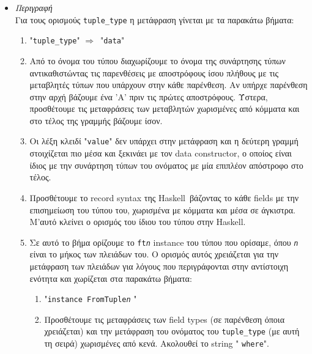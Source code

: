 \documentclass[diploma]{softlab-thesis}
\def\H{Haskell}
\def\lra{$\Longrightarrow$\ }
\begin{document}
\begin{itemize}
\begin{verbatim}
c0root :: a1 -> A'Tree a1 -> A'Tree a1
c0subtrees :: A'Trees a1 -> A'Tree a1 -> A'Tree a1
c0root = \new x -> x { root = new }
c0subtrees = \new x -> x { subtrees = new }
\end{verbatim}
\item
\textit{Περιγραφή}\\

Για τους ορισμούς \verb|tuple_type| η μετάφραση γίνεται με τα παρακάτω βήματα:

\begin{enumerate}

\item
"\verb|tuple_type|" \lra "\texttt{data}"

\item
Από το όνομα του τύπου διαχωρίζουμε το όνομα της συνάρτησης τύπων
αντικαθιστώντας τις παρενθέσεις με αποστρόφους ίσου πλήθους με τις μεταβλητές
τύπων που υπάρχουν στην κάθε παρένθεση. Αν υπήρχε παρένθεση στην αρχή βάζουμε
ένα 'A' πριν τις πρώτες αποστρόφους. Ύστερα, προσθέτουμε τις μεταφράσεις των
μεταβλητών χωρισμένες από κόμματα και στο τέλος της γραμμής βάζουμε ίσον.

\item
Οι λέξη κλειδί "\texttt{value}" δεν υπάρχει στην μετάφραση και η δεύτερη
γραμμή στοιχίζεται πιο μέσα και ξεκινάει με τον data constructor, ο οποίος
είναι ίδιος με την συνάρτηση τύπων του ονόματος με μία επιπλέον απόστροφο στο
τέλος.

\item
Προσθέτουμε το record syntax της \H\ βάζοντας το κάθε fields με την επισημείωση
του τύπου του, χωρισμένα με κόμματα και μέσα σε άγκιστρα.  Μ'αυτό κλείνει ο
ορισμός του ίδιου του τύπου στην \H.

\item
Σε αυτό το βήμα ορίζουμε το \texttt{ft\textit{n}} instance του τύπου που
ορίσαμε, όπου \texttt{\textit{n}} είναι το μήκος των πλειάδων του. Ο ορισμός
αυτός χρειάζεται για την μετάφραση των πλειάδων για λόγους που περιγράφονται
στην αντίστοιχη ενότητα και χωρίζεται στα παρακάτω βήματα:

\begin{enumerate}
\item
"\texttt{instance FromTuple}\texttt{\textit{n}} "

\item
Προσθέτουμε τις μεταφράσεις των field types (σε παρένθεση όποια χρειάζεται)
και την μετάφραση του ονόματος του \verb|tuple_type| (με αυτή τη σειρά)
χωρισμένες από κενά. Ακολουθεί το string " \texttt{where}".


\end{enumerate}
\end{enumerate}
\end{itemize}
\end{document}
